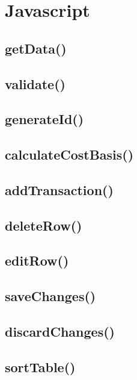 \documentclass[letterpaper]{article}
\begin{document}
\newpage

\section{Javascript}\label{JS}

\subsection{getData()}

\subsection{validate()}

\subsection{generateId()}

\subsection{calculateCostBasis()}

\subsection{addTransaction()}

\subsection{deleteRow()}

\subsection{editRow()}

\subsection{saveChanges()}

\subsection{discardChanges()}

\subsection{sortTable()}

\newpage
\end{document}

